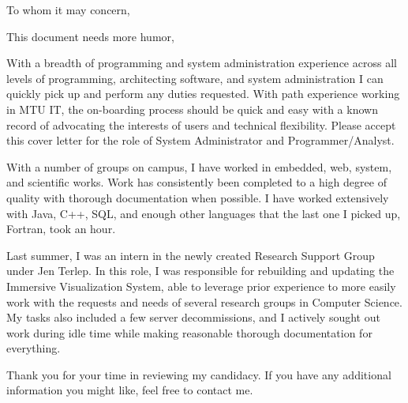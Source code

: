 \documentclass[11pt,a4paper,sans]{moderncv}        %
\begin{document}
\date{April 14, 2018}
\opening{To whom it may concern,}
\closing{This document needs more humor,}
\makelettertitle


With a breadth of programming and system administration experience across all levels of programming, architecting software, and system administration I can quickly pick up and perform any duties requested.  With path experience working in MTU IT, the on-boarding process should be quick and easy with a known record of advocating the interests of users and technical flexibility.  Please accept this cover letter for the role of System Administrator and Programmer/Analyst.



With a number of groups on campus, I have worked in embedded, web, system, and scientific works.  Work has consistently been completed to a high degree of quality with thorough documentation when possible.  I have worked extensively with Java, C++, SQL, and enough other languages that the last one I picked up, Fortran, took an hour.  


Last summer, I was an intern in the newly created Research Support Group under Jen Terlep.  In this role, I was responsible for rebuilding and updating the Immersive Visualization System, able to leverage prior experience to more easily work with the requests and needs of several research groups in Computer Science.  My tasks also included a few server decommissions, and I actively sought out work during idle time while making reasonable thorough documentation for everything.


Thank you for your time in reviewing my candidacy.  If you have any additional information you might like, feel free to contact me.


\makeletterclosing
\end{document}
